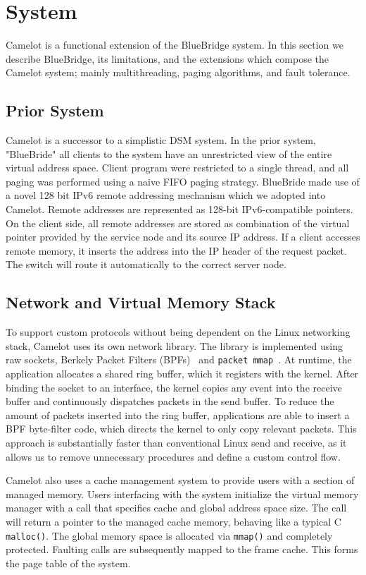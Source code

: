 \section{System} \label{sec:system}
Camelot is a functional extension of the BlueBridge system. In this section we
describe BlueBridge, its limitations, and the extensions which compose the
Camelot system; mainly multithreading, paging algorithms, and fault tolerance.
 \subsection{Prior System} Camelot is a successor to a
simplistic DSM system. In the prior system, "BlueBride" all clients to the
system have an unrestricted view of the entire virtual address space.  Client
program were restricted to a single thread, and all paging was performed using
a naive FIFO paging strategy. BlueBride made use of a novel 128 bit IPv6 remote
addressing mechanism which we adopted into Camelot. Remote addresses are
represented as 128-bit IPv6-compatible pointers. On the client side, all remote
addresses are stored as combination of the virtual pointer provided by the
service node and its source IP address. If a client accesses remote memory, it
inserts the address into the IP header of the request packet. The switch will
route it automatically to the correct server node.

\subsection{Network and Virtual Memory Stack}
To support custom protocols without being dependent on the Linux networking stack, Camelot uses its own network library. The library is implemented using raw sockets, Berkely Packet Filters (BPFs)~\cite{bpf} and \texttt{packet mmap}~\cite{packet_mmap}.
At runtime, the application allocates a shared ring buffer, which it registers with the kernel.  After binding the socket to an interface, the kernel copies any event into the receive buffer and continuously dispatches packets in the send buffer. To reduce the amount of packets inserted into the ring buffer, applications are able to insert a BPF byte-filter code, which directs the kernel to only copy relevant packets. This approach is substantially faster than conventional Linux send and receive, as it allows us to remove unnecessary procedures and define a custom control flow.

Camelot also uses a cache management system to provide users with a section of managed memory. Users interfacing with the system initialize the virtual memory manager with a call that specifies cache and global address space size. The call will return a pointer to the managed cache memory, behaving like a typical C \texttt{malloc()}. The global memory space is allocated via \texttt{mmap()} and completely protected. Faulting calls are subsequently mapped to the frame cache. This forms the page table of the system. 

